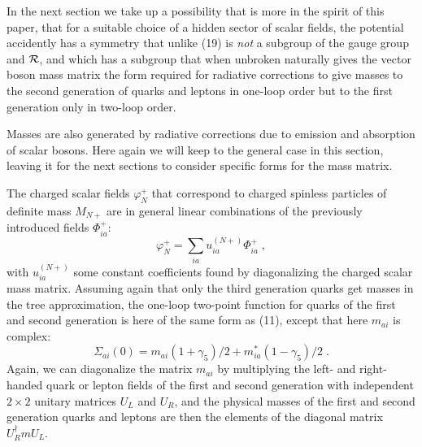 \documentclass[12pt]{article}
\begin{document}
In the next section we take up a possibility that is more in the spirit of this paper, that for a suitable choice of a hidden sector of scalar fields, the potential accidently has a symmetry that unlike (19) is {\em not} a subgroup of the gauge group and ${\cal R}$, and which  has a subgroup that when unbroken naturally gives the vector boson mass matrix  the form required for radiative corrections to give masses to the second generation of quarks and leptons in one-loop order but to the first generation only in two-loop order.


Masses are also generated by radiative corrections due to emission and absorption of scalar bosons.  Here again we will keep to the general case in this section, leaving it for the next sections to consider specific forms for the mass matrix.

The charged scalar fields $\varphi_N^+$ that correspond to charged spinless particles of definite mass $M_{N+}$ are in general linear combinations of the previously introduced fields $\Phi_{ia}^+$:
\begin{equation}
\varphi^+_N=\sum_{ia} u^{(N+)}_{ia}\Phi^+_{ia}\;,
\end{equation}
with $u^{(N+)}_{ia}$ some constant coefficients found by diagonalizing the charged scalar mass matrix.  
Assuming again that only the third generation quarks get masses in the tree approximation, the one-loop two-point function  for quarks of the first and second generation is here of the same form as (11), except that here $m_{ai}$ is  complex:
\begin{equation}
\Sigma_{ai}(0)=m_{ai}(1+\gamma_5)/2+m^*_{ia}(1-\gamma_5)/2 \;.
\end{equation}
Again, we can diagonalize the matrix $m_{ai}$    by multiplying  the left- and right-handed quark or lepton fields of the first and second generation with independent $2\times 2$  unitary matrices $U_L$ and $U_R$, and  the physical masses of the first and second generation quarks and leptons are then the  elements of the diagonal matrix $U_R^\dagger m U_L$.
\end{document}
